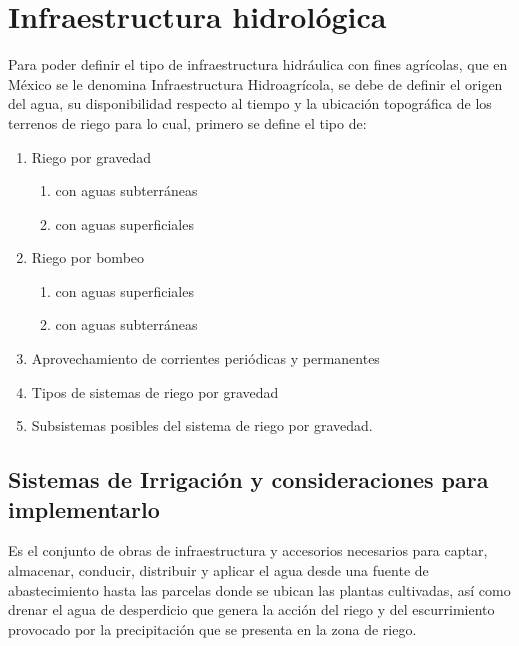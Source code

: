 \section{Infraestructura hidrológica}

Para poder definir el tipo de infraestructura hidráulica con fines agrícolas, que en
México se le denomina Infraestructura Hidroagrícola, se debe de definir
el origen del agua, su disponibilidad respecto al tiempo y la ubicación topográfica de los
terrenos de riego para lo cual, primero se define el tipo de:

\begin{enumerate}
	\item Riego por gravedad
	      \begin{enumerate}
		      \item con aguas subterráneas
		      \item con aguas superficiales
	      \end{enumerate}
	\item Riego por bombeo
	      \begin{enumerate}
		      \item con aguas superficiales
		      \item con aguas subterráneas
	      \end{enumerate}
	\item Aprovechamiento de corrientes periódicas y permanentes
	\item Tipos de sistemas de riego por gravedad
	\item Subsistemas posibles del sistema de riego por gravedad.
\end{enumerate}

\subsection{Sistemas de Irrigación y consideraciones para implementarlo}

\begin{definition}
	Es el conjunto de obras de infraestructura y accesorios
	necesarios para captar, almacenar, conducir, distribuir y aplicar el agua desde una
	fuente de abastecimiento hasta las parcelas donde se ubican las plantas cultivadas, así
	como drenar el agua de desperdicio que genera la acción del riego y del escurrimiento
	provocado por la precipitación que se presenta en la zona de riego.
\end{definition}

